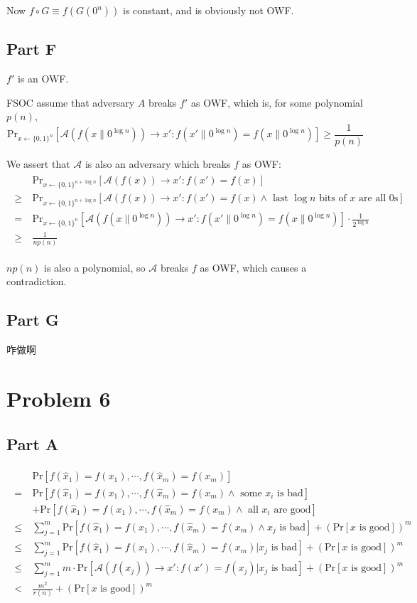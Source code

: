 \documentclass[8pt]{article}
\theoremstyle{compact}
\def\le{\leqslant}
\def\ge{\geqslant}
\begin{document}
Now $f \circ G \equiv f(G(0^n))$ is constant, and is obviously not OWF. 
\subsection*{Part F}
$f'$ is an OWF.

FSOC assume that adversary $A$ breaks $f'$ as OWF, which is, for some polynomial $p(n)$, $$\text{Pr}_{x \gets \{0, 1\}^{n}}[\mathcal A(f(x \| 0^{\log n})) \to x': f(x' \| 0^{\log n}) = f(x \| 0^{\log n})] \ge \frac{1}{p(n)}$$

We assert that $\mathcal A$ is also an adversary which breaks $f$ as OWF: \begin{align*}
	\begin{split}
		&\text{Pr}_{x \gets \{0, 1\}^{n+\log n}}[\mathcal A(f(x)) \to x': f(x') = f(x)] \\\ge\ & \text{Pr}_{x \gets \{0, 1\}^{n+\log n}}[\mathcal A(f(x)) \to x': f(x') = f(x) \wedge \text{ last } \log n \text{ bits of } x \text{ are all } 0\text{s}] \\=\ & \text{Pr}_{x \gets \{0, 1\}^{n}}[\mathcal A(f(x \| 0^{\log n})) \to x': f(x' \| 0^{\log n}) = f(x \| 0^{\log n})] \cdot \frac{1}{2^{\log n}} \\\ge\ &\frac{1}{np(n)}
	\end{split}
\end{align*}

$np(n)$ is also a polynomial, so $\mathcal A$ breaks $f$ as OWF, which causes a contradiction.
\subsection*{Part G}
咋做啊
\section*{Problem 6}
\subsection*{Part A}
\begin{align*}
	\begin{split}
		&\text{Pr}[f(\hat x_1) = f(x_1), \cdots, f(\hat x_m) = f(x_m)] \\= \ & \text{Pr}[f(\hat x_1) = f(x_1), \cdots, f(\hat x_m) = f(x_m) \wedge \text{ some } x_i \text{ is bad}] \\&+ \text{Pr}[f(\hat x_1) = f(x_1), \cdots, f(\hat x_m) = f(x_m) \wedge \text{ all } x_i \text{ are good}] \\ \le\ & \sum_{j=1}^{m}\text{Pr}[f(\hat x_1) = f(x_1), \cdots, f(\hat x_m) = f(x_m) \wedge x_j \text{ is bad}] + \left(\text{Pr}[x \text{ is good}]\right)^m \\ \le\ & \sum_{j=1}^{m}\text{Pr}[f(\hat x_1) = f(x_1), \cdots, f(\hat x_m) = f(x_m) | x_j \text{ is bad}] + \left(\text{Pr}[x \text{ is good}]\right)^m \\ \le\ & \sum_{j=1}^{m}m \cdot \text{Pr}[\mathcal A(f(x_j)) \to x': f(x') = f(x_j) | x_j \text{ is bad}] + \left(\text{Pr}[x \text{ is good}]\right)^m \\ < \ & \frac{m^2}{r(n)} + \left(\text{Pr}[x \text{ is good}]\right)^m
	\end{split}
\end{align*}
\end{document}
